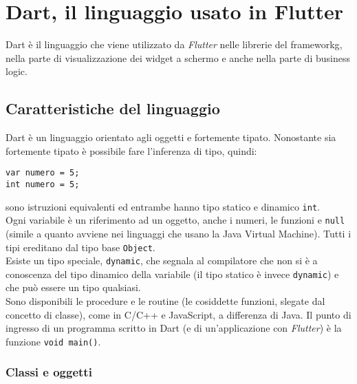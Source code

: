 \section{Dart, il linguaggio usato in Flutter}
\label{sec:linguaggio-dart}

Dart è il linguaggio che viene utilizzato da \emph{Flutter} nelle librerie del \gls{frameworkg}, nella parte di visualizzazione dei widget a schermo e anche nella parte di business logic.

\subsection{Caratteristiche del linguaggio}
\label{subsec:caratteristiche-linguaggio}

Dart è un linguaggio orientato agli oggetti e fortemente tipato. Nonostante sia fortemente tipato è possibile fare l'inferenza di tipo, quindi:
\begin{lstlisting}
var numero = 5;
int numero = 5;
\end{lstlisting}
sono istruzioni equivalenti ed entrambe hanno tipo statico e dinamico \texttt{int}.\\
Ogni variabile è un riferimento ad un oggetto, anche i numeri, le funzioni e \texttt{null} (simile a quanto avviene nei linguaggi che usano la Java Virtual Machine).
Tutti i tipi ereditano dal tipo base \texttt{Object}.\\
Esiste un tipo speciale, \texttt{dynamic}, che segnala al compilatore che non si è a conoscenza del tipo dinamico della variabile (il tipo statico è invece \texttt{dynamic}) e che può essere un tipo qualsiasi.\\
Sono disponibili le procedure e le routine (le cosiddette funzioni, slegate dal concetto di classe), come in C/C++ e JavaScript, a differenza di Java. Il punto di ingresso di un programma scritto in Dart (e di un'applicazione con \emph{Flutter}) è la funzione \texttt{void main()}.

\subsubsection{Classi e oggetti}
\label{subsubsec:classi-oggetti}

